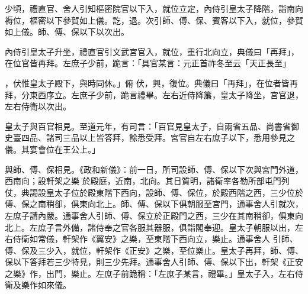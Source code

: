 \begin{pinyinscope}
 少頃，禮直官、舍人引知樞密院官以下入，就位立定，內侍引皇太子降階，詣南向褥位，樞密以下參賀如上儀。訖，退。次引師、傅、保、賓客以下入，就位，參賀如上儀。師、傅、保以下以次出。



 內侍引皇太子升坐，禮直官引文武宮官入，就位，重行北向立，典儀曰「再拜」，在位官皆再拜。左庶子少前，跪言：「具官某言：元正首祚冬至云「天正長至」



 ，伏惟皇太子殿下，與時同休。」俯
 伏，興，復位。典儀曰「再拜」，在位者皆再拜，分東西序立。左庶子少前，跪言禮畢。左右近侍降簾，皇太子降坐，宮官退，左右侍衛以次出。



 皇太子與百官相見。至道元年，有司言：「百官見皇太子，自兩省五品、尚書省御史臺四品、諸司三品以上皆答拜，餘悉受拜。宮官自左右庶子以下，悉用參見之儀。其宴會位在王公上。」



 與師、傅、保相見。《政和新儀》：前一日，所司設師、傅、保以下次與宮門外道，西南向；設軒架之樂
 於殿庭，近南，北向。其日質明，諸衛率各勒所部屯門列仗，典謁設皇太子位於殿東階下西向，設師、傅、保位，於殿西階之西，三少位於傅、保之南稍卻，俱東向北上。師、傅、保以下俱朝服至宮門，通事舍人引就次，左庶子請內嚴。通事舍人引師、傅、保立於正殿門之西，三少在其南稍卻，俱東向北上。左庶子言外備，諸侍奉之官各服其器服，俱詣閣奉迎。皇太子朝服以出，左右侍衛如常儀，軒架作《翼安》之樂，至東階下西向立，樂止。通事舍人
 引師、傅、保及三少入，就位，軒架作《正安》之樂，至位樂止。皇太子再拜，師、傅、保以下答拜若三少特見，則三少先拜。通事舍人引師、傅、保以下出，軒架《正安之樂》作，出門，樂止。左庶子前跪稱：「左庶子某言，禮畢。」皇太子入，左右侍衛及樂作如來儀。



\end{pinyinscope}